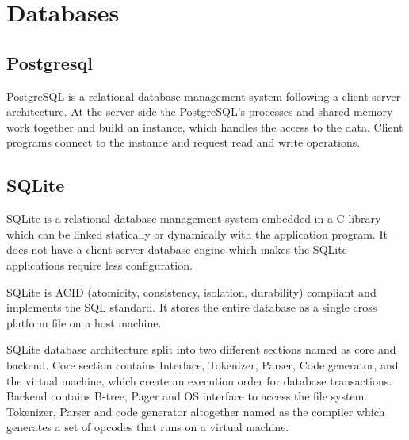 \section{Databases}
\label{sec:db}

\subsection{Postgresql}
PostgreSQL is a relational database management system following a client-server architecture. At the server side the PostgreSQL's processes and shared memory work together and build an instance, which handles the access to the data. Client programs connect to the instance and request read and write operations.

\subsection{SQLite}


SQLite is a relational database management system embedded in a C library  which can be linked statically or dynamically with the application program. It does not have a client-server database engine which makes the SQLite applications require less configuration. 

SQLite is ACID  (atomicity, consistency, isolation, durability) compliant and implements the SQL standard. It stores the entire database as a single cross platform file on a host machine. 

SQLite database architecture split into two different sections named as core and backend. Core section contains Interface, Tokenizer, Parser, Code generator, and the virtual machine, which create an execution order for database transactions. Backend contains B-tree, Pager and OS interface to access the file system. Tokenizer, Parser and code generator altogether named as the compiler which generates a set of opcodes that runs on a virtual machine.
